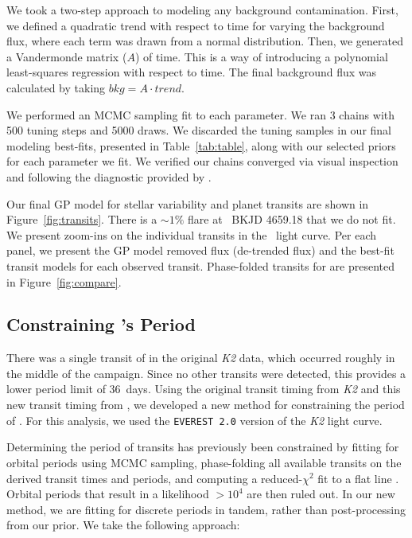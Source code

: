 \documentclass[twocolumn]{aastex631}
\begin{document}
We took a two-step approach to modeling any background contamination. First, we defined a quadratic trend with respect to time for varying the background flux, where each term was drawn from a normal distribution. Then, we generated a Vandermonde matrix ($A$) of time. This is a way of introducing a polynomial least-squares regression with respect to time. The final background flux was calculated by taking $bkg = A \cdot trend$.  

We performed an MCMC sampling fit to each parameter. We ran 3 chains with 500 tuning steps and 5000 draws. We discarded the tuning samples in our final modeling best-fits, presented in Table~\ref{tab:table}, along with our selected priors for each parameter we fit. We verified our chains converged via visual inspection and following the diagnostic provided by \cite{Geweke92}.

Our final GP model for stellar variability and planet transits are shown in Figure~\ref{fig:transits}. There is a $\sim 1\%$ flare at \tess\ BKJD 4659.18 that we do not fit. We present zoom-ins on the individual transits in the \tess\ light curve. Per each panel, we present the GP model removed flux (de-trended flux) and the best-fit transit models for each observed transit. Phase-folded transits for \planetknown are presented in Figure~\ref{fig:compare}.


\subsection{Constraining \planete's Period}

There was a single transit of \planete in the original \textit{K2} data, which occurred roughly in the middle of the campaign. Since no other transits were detected, this provides a lower period limit of 36~days. Using the original transit timing from \textit{K2} and this new transit timing from \tess, we developed a new method for constraining the period of \planete. For this analysis, we used the \texttt{EVEREST 2.0} \citep{luger18} version of the \textit{K2} light curve. 

Determining the period of transits has previously been constrained by fitting for orbital periods using MCMC sampling, phase-folding all available transits on the derived transit times and periods, and computing a reduced-$\chi^2$ fit to a flat line \citep{becker19}. Orbital periods that result in a likelihood $> 10^4$ are then ruled out. In our new method, we are fitting for discrete periods in tandem, rather than post-processing from our prior. We take the following approach:
\end{document}
